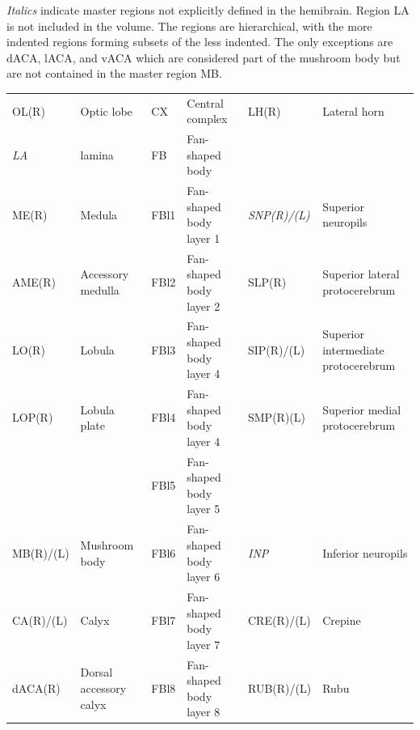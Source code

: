 \documentclass{article}
\begin{document}
\noindent \emph{Italics} indicate master regions not explicitly defined in the hemibrain. Region LA is not included in the volume. The regions are hierarchical, with the more indented regions forming subsets of the less indented. The only exceptions are dACA, lACA, and vACA which are considered part of the mushroom body but are not contained in the master region MB.
\begin{center}\scriptsize
\begin{longtable}{llllll}
OL(R) & Optic lobe & CX & Central complex & LH(R) & Lateral horn \\
\hspace*{0.8em}\emph{LA} & lamina & \hspace*{0.8em}FB & Fan-shaped body &  &  \\
\hspace*{0.8em}ME(R) & Medula & \hspace*{1.6em}FBl1 & Fan-shaped body layer 1 & \emph{SNP(R)/(L)} & Superior neuropils \\
\hspace*{0.8em}AME(R) & Accessory medulla & \hspace*{1.6em}FBl2 & Fan-shaped body layer 2 & \hspace*{0.8em}SLP(R) & Superior lateral protocerebrum \\
\hspace*{0.8em}LO(R) & Lobula & \hspace*{1.6em}FBl3 & Fan-shaped body layer 4 & \hspace*{0.8em}SIP(R)/(L) & Superior intermediate protocerebrum \\
\hspace*{0.8em}LOP(R) & Lobula plate & \hspace*{1.6em}FBl4 & Fan-shaped body layer 4 & \hspace*{0.8em}SMP(R)(L) & Superior medial protocerebrum \\
 &  & \hspace*{1.6em}FBl5 & Fan-shaped body layer 5 &  &  \\
MB(R)/(L) & Mushroom body & \hspace*{1.6em}FBl6 & Fan-shaped body layer 6 & \emph{INP} & Inferior neuropils \\
\hspace*{0.8em}CA(R)/(L) & Calyx & \hspace*{1.6em}FBl7 & Fan-shaped body layer 7 & \hspace*{0.8em}CRE(R)/(L) & Crepine \\
\hspace*{0.8em}dACA(R) & Dorsal accessory calyx & \hspace*{1.6em}FBl8 & Fan-shaped body layer 8 & \hspace*{1.6em}RUB(R)/(L) & Rubu \\

\end{longtable}
\end{center}
\end{document}
